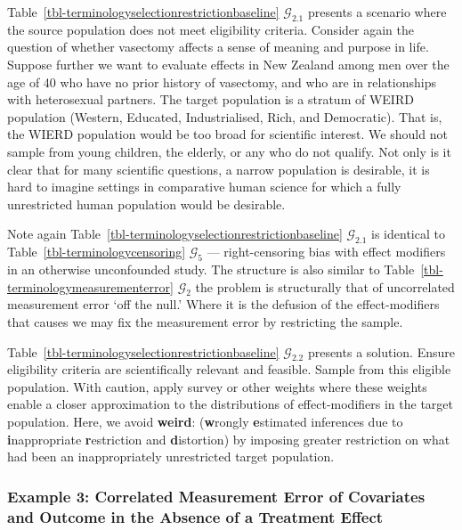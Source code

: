 \documentclass[
  single column]{article}
\begin{document}
Table~\ref{tbl-terminologyselectionrestrictionbaseline}
\(\mathcal{G}_{2.1}\) presents a scenario where the source population
does not meet eligibility criteria. Consider again the question of
whether vasectomy affects a sense of meaning and purpose in life.
Suppose further we want to evaluate effects in New Zealand among men
over the age of 40 who have no prior history of vasectomy, and who are
in relationships with heterosexual partners. The target population is a
stratum of WEIRD population (Western, Educated, Industrialised, Rich,
and Democratic). That is, the WIERD population would be too broad for
scientific interest. We should not sample from young children, the
elderly, or any who do not qualify. Not only is it clear that for many
scientific questions, a narrow population is desirable, it is hard to
imagine settings in comparative human science for which a fully
unrestricted human population would be desirable.

Note again Table~\ref{tbl-terminologyselectionrestrictionbaseline}
\(\mathcal{G}_{2.1}\) is identical to
Table~\ref{tbl-terminologycensoring} \(\mathcal{G}_5\) ---
right-censoring bias with effect modifiers in an otherwise unconfounded
study. The structure is also similar to
Table~\ref{tbl-terminologymeasurementerror} \(\mathcal{G}_2\) the
problem is structurally that of uncorrelated measurement error `off the
null.' Where it is the defusion of the effect-modifiers that causes we
may fix the measurement error by restricting the sample.

Table~\ref{tbl-terminologyselectionrestrictionbaseline}
\(\mathcal{G}_{2.2}\) presents a solution. Ensure eligibility criteria
are scientifically relevant and feasible. Sample from this eligible
population. With caution, apply survey or other weights where these
weights enable a closer approximation to the distributions of
effect-modifiers in the target population. Here, we avoid
\textbf{weird}: (\textbf{w}rongly \textbf{e}stimated inferences due to
\textbf{i}nappropriate \textbf{r}estriction and \textbf{d}istortion) by
imposing greater restriction on what had been an inappropriately
unrestricted target population.

\subsubsection{Example 3: Correlated Measurement Error of Covariates and
Outcome in the Absence of a Treatment
Effect}\label{example-3-correlated-measurement-error-of-covariates-and-outcome-in-the-absence-of-a-treatment-effect}
\end{document}
